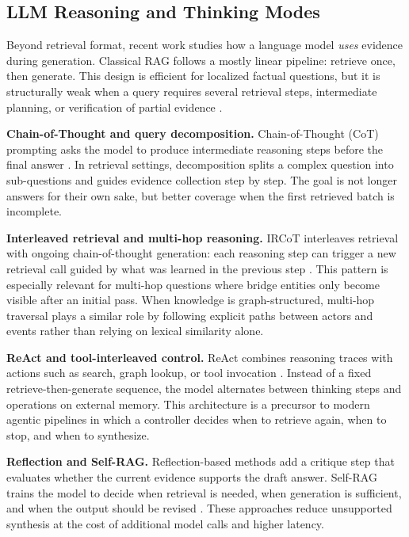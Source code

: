 \subsection{LLM Reasoning and Thinking Modes}

Beyond retrieval format, recent work studies how a language model \emph{uses} evidence during generation. Classical RAG follows a mostly linear pipeline: retrieve once, then generate. This design is efficient for localized factual questions, but it is structurally weak when a query requires several retrieval steps, intermediate planning, or verification of partial evidence \cite{lewis-rag}.

\textbf{Chain-of-Thought and query decomposition.} Chain-of-Thought (CoT) prompting asks the model to produce intermediate reasoning steps before the final answer \cite{wei-cot}. In retrieval settings, decomposition splits a complex question into sub-questions and guides evidence collection step by step. The goal is not longer answers for their own sake, but better coverage when the first retrieved batch is incomplete.

\textbf{Interleaved retrieval and multi-hop reasoning.} IRCoT interleaves retrieval with ongoing chain-of-thought generation: each reasoning step can trigger a new retrieval call guided by what was learned in the previous step \cite{trivedi-ircot}. This pattern is especially relevant for multi-hop questions where bridge entities only become visible after an initial pass. When knowledge is graph-structured, multi-hop traversal plays a similar role by following explicit paths between actors and events rather than relying on lexical similarity alone.

\textbf{ReAct and tool-interleaved control.} ReAct combines reasoning traces with actions such as search, graph lookup, or tool invocation \cite{yao-react}. Instead of a fixed retrieve-then-generate sequence, the model alternates between thinking steps and operations on external memory. This architecture is a precursor to modern agentic pipelines in which a controller decides when to retrieve again, when to stop, and when to synthesize.

\textbf{Reflection and Self-RAG.} Reflection-based methods add a critique step that evaluates whether the current evidence supports the draft answer. Self-RAG trains the model to decide when retrieval is needed, when generation is sufficient, and when the output should be revised \cite{asai-selfrag}. These approaches reduce unsupported synthesis at the cost of additional model calls and higher latency.


